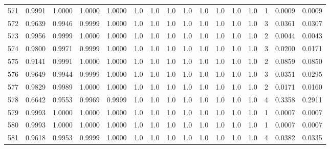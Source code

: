 \begin{tabular}{lrrrrrrrrrrrrrrr}
571 &      0.9991 &  1.0000 &  1.0000 &  1.0000 &     1.0 &     1.0 &     1.0 &     1.0 &     1.0 &     1.0 &      1.0 &        1.0 &      1 &                    0.0009 &                     0.0009 \\
572 &      0.9639 &  0.9946 &  0.9999 &  1.0000 &     1.0 &     1.0 &     1.0 &     1.0 &     1.0 &     1.0 &      1.0 &        1.0 &      3 &                    0.0361 &                     0.0307 \\
573 &      0.9956 &  0.9999 &  1.0000 &  1.0000 &     1.0 &     1.0 &     1.0 &     1.0 &     1.0 &     1.0 &      1.0 &        1.0 &      2 &                    0.0044 &                     0.0043 \\
574 &      0.9800 &  0.9971 &  0.9999 &  1.0000 &     1.0 &     1.0 &     1.0 &     1.0 &     1.0 &     1.0 &      1.0 &        1.0 &      3 &                    0.0200 &                     0.0171 \\
575 &      0.9141 &  0.9991 &  1.0000 &  1.0000 &     1.0 &     1.0 &     1.0 &     1.0 &     1.0 &     1.0 &      1.0 &        1.0 &      2 &                    0.0859 &                     0.0850 \\
576 &      0.9649 &  0.9944 &  0.9999 &  1.0000 &     1.0 &     1.0 &     1.0 &     1.0 &     1.0 &     1.0 &      1.0 &        1.0 &      3 &                    0.0351 &                     0.0295 \\
577 &      0.9829 &  0.9989 &  1.0000 &  1.0000 &     1.0 &     1.0 &     1.0 &     1.0 &     1.0 &     1.0 &      1.0 &        1.0 &      2 &                    0.0171 &                     0.0160 \\
578 &      0.6642 &  0.9553 &  0.9969 &  0.9999 &     1.0 &     1.0 &     1.0 &     1.0 &     1.0 &     1.0 &      1.0 &        1.0 &      4 &                    0.3358 &                     0.2911 \\
579 &      0.9993 &  1.0000 &  1.0000 &  1.0000 &     1.0 &     1.0 &     1.0 &     1.0 &     1.0 &     1.0 &      1.0 &        1.0 &      1 &                    0.0007 &                     0.0007 \\
580 &      0.9993 &  1.0000 &  1.0000 &  1.0000 &     1.0 &     1.0 &     1.0 &     1.0 &     1.0 &     1.0 &      1.0 &        1.0 &      1 &                    0.0007 &                     0.0007 \\
581 &      0.9618 &  0.9953 &  0.9999 &  1.0000 &     1.0 &     1.0 &     1.0 &     1.0 &     1.0 &     1.0 &      1.0 &        1.0 &      4 &                    0.0382 &                     0.0335 \\

\end{tabular}
